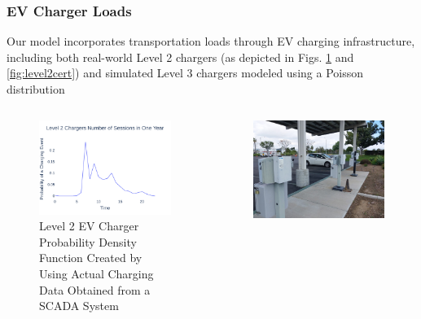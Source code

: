\documentclass[aspectratio=169, 8 pt]{beamer}
\begin{document}
	\begin{frame}
		\frametitle{EV Charger Loads}
		Our model incorporates transportation loads through EV charging infrastructure, including both real-world Level 2 chargers (as depicted in Figs. \ref{fig:l2avgdayrandpoisson1hourpdf} and \ref{fig:level2cert}) and simulated Level 3 chargers modeled using a Poisson distribution
		\begin{columns}
			\begin{column}{0.5\linewidth}
				\begin{block}{}
					\begin{figure}
						\centering
						\includegraphics[width=0.9\linewidth]{Fig/l2_real_poisson_1_hour_pdf.pdf}
						\caption{\footnotesize Level 2 EV Charger Probability Density Function  Created  by Using Actual Charging Data Obtained from a SCADA System}
						\label{fig:l2avgdayrandpoisson1hourpdf}
					\end{figure}
				\end{block}
			\end{column}
			\begin{column}{0.5\linewidth}
				\begin{block}{}
					\begin{figure}
						\centering
						\includegraphics[width=0.9\linewidth]{Fig/Option_3/level_2_cert}

\end{figure}
\end{block}
\end{column}
\end{columns}
\end{frame}
\end{document}

